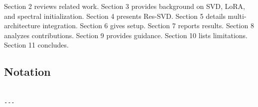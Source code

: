 Section 2 reviews related work. Section 3 provides background on SVD, LoRA, 
and spectral initialization. Section 4 presents Res-SVD. Section 5 details 
multi-architecture integration. Section 6 gives setup. Section 7 reports 
results. Section 8 analyzes contributions. Section 9 provides guidance. 
Section 10 lists limitations. Section 11 concludes.



\subsection{Notation}

\begin{lstlisting}

---
\end{lstlisting}
